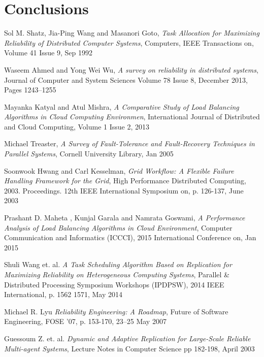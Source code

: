 \documentclass{cslthse-msc}
\begin{document}
\chapter{Conclusions} \label{ch:conclusions}

\begin{thebibliography}{50}

	Sol M. Shatz, Jia-Ping Wang and Masanori Goto,
	\emph{Task Allocation for Maximizing Reliability of Distributed Computer Systems},
	Computers, IEEE Transactions on, Volume 41  Issue 9,
	Sep 1992
	
	Waseem Ahmed and Yong Wei Wu,
	\emph{A survey on reliability in distributed systems},
	Journal of Computer and System Sciences Volume 78 Issue 8,
	December 2013, Pages 1243–1255

	Mayanka Katyal and Atul Mishra,
	\emph{A Comparative Study of Load Balancing Algorithms in Cloud Computing Environmen},
	International Journal of Distributed and Cloud Computing, Volume 1 Issue 2,
	2013

	Michael Treaster,
	\emph{A Survey of Fault-Tolerance and Fault-Recovery Techniques in Parallel Systems},
	Cornell University Library,
	Jan 2005

	Soonwook Hwang and Carl Kesselman,
	\emph{Grid Workflow: A Flexible Failure Handling Framework for the Grid},
	High Performance Distributed Computing, 2003. Proceedings. 12th IEEE International Symposium on, p. 	126-137, 
	June 2003

	Prashant D. Maheta , Kunjal Garala and Namrata Goswami,
	\emph{A Performance Analysis of Load Balancing Algorithms in Cloud Environment},
	Computer Communication and Informatics (ICCCI), 2015 International Conference on,
	Jan 2015
	
	Shuli Wang et. al.
	\emph{A Task Scheduling Algorithm Based on Replication for Maximizing Reliability on Heterogeneous Computing Systems},
	Parallel \& Distributed Processing Symposium Workshops (IPDPSW), 2014 IEEE International, p. 1562 1571, 
	May 2014

	Michael R. Lyu
	\emph{Reliability Engineering: A Roadmap},
	Future of Software Engineering, FOSE ’07, p. 153-170,
	23–25 May 2007
	
	Guessoum Z. et. al.
	\emph{Dynamic and Adaptive Replication for Large-Scale Reliable Multi-agent Systems},
	Lecture Notes in Computer Science pp 182-198,
	April 2003


\end{thebibliography}
\end{document}
